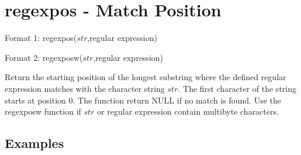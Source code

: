 
%

\section{regexpos - Match Position\label{sect:regexpos}}

Format 1: regexpos($str$,regular expression)

Format 2: regexposw($str$,regular expression)

Return the starting position of the longest substring where the defined regular expression matches with the character string $str$. The first character of the string starts at position 0. The function return NULL if no match is found. Use the regexposw function if $str$ or regular expression contain multibyte characters. 


\subsection*{Examples}


%

